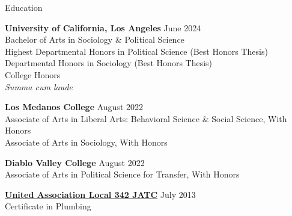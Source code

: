 \documentclass[
	11pt, %
]{resume} %
\begin{document}
\thispagestyle{firstpagestyle}

\begin{samepage}
\begin{rSection}{Education}
	
	\textbf{University of California, Los Angeles} \hfill June 2024\\
	Bachelor of Arts in Sociology \& Political Science\\
	Highest Departmental Honors in Political Science (Best Honors Thesis)\\
	Departmental Honors in Sociology (Best Honors Thesis)\\
	College Honors\\
	\textit{Summa cum laude}

	\textbf{Los Medanos College} \hfill August 2022\\ 
	Associate of Arts in Liberal Arts: Behavioral Science \& Social Science, With Honors\\
	Associate of Arts in Sociology, With Honors

	\textbf{Diablo Valley College} \hfill August 2022\\ 
	Associate of Arts in Political Science for Transfer, With Honors
	
	\href{https://ua342.org/training}{\textbf{United Association Local 342 JATC}} \hfill July 2013\\
	Certificate in Plumbing
\end{rSection}
\end{samepage}
\end{document}
